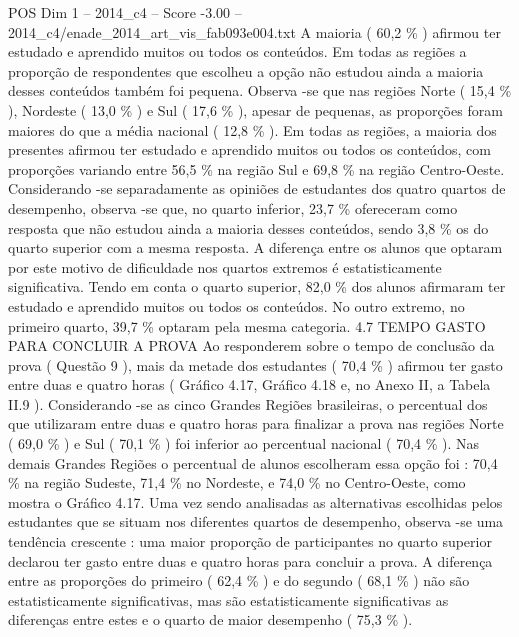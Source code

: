 \begin{textsample}{POS Dim 1 – 2014\_c4 – Score -3.00 – 2014\_c4/enade\_2014\_art\_vis\_fab093e004.txt}
A maioria ( 60,2 \% ) afirmou ter estudado e aprendido muitos ou todos os conteúdos.
Em todas as regiões a proporção de respondentes que escolheu a opção não estudou ainda a maioria desses conteúdos também foi pequena.
Observa -se que nas regiões Norte ( 15,4 \% ), Nordeste ( 13,0 \% ) e Sul ( 17,6 \% ), apesar de pequenas, as proporções foram maiores do que a média nacional ( 12,8 \% ).
Em todas as regiões, a maioria dos presentes afirmou ter estudado e aprendido muitos ou todos os conteúdos, com proporções variando entre 56,5 \% na região Sul e 69,8 \% na região Centro-Oeste.
Considerando -se separadamente as opiniões de estudantes dos quatro quartos de desempenho, observa -se que, no quarto inferior, 23,7 \% ofereceram como resposta que não estudou ainda a maioria desses conteúdos, sendo 3,8 \% os do quarto superior com a mesma resposta.
A diferença entre os alunos que optaram por este motivo de dificuldade nos quartos extremos é estatisticamente significativa.
Tendo em conta o quarto superior, 82,0 \% dos alunos afirmaram ter estudado e aprendido muitos ou todos os conteúdos.
No outro extremo, no primeiro quarto, 39,7 \% optaram pela mesma categoria. 4.7 TEMPO GASTO PARA CONCLUIR A PROVA Ao responderem sobre o tempo de conclusão da prova ( Questão 9 ), mais da metade dos estudantes ( 70,4 \% ) afirmou ter gasto entre duas e quatro horas ( Gráfico 4.17, Gráfico 4.18 e, no Anexo II, a Tabela II.9 ).
Considerando -se as cinco Grandes Regiões brasileiras, o percentual dos que utilizaram entre duas e quatro horas para finalizar a prova nas regiões Norte ( 69,0 \% ) e Sul ( 70,1 \% ) foi inferior ao percentual nacional ( 70,4 \% ).
Nas demais Grandes Regiões o percentual de alunos escolheram essa opção foi : 70,4 \% na região Sudeste, 71,4 \% no Nordeste, e 74,0 \% no Centro-Oeste, como mostra o Gráfico 4.17.
Uma vez sendo analisadas as alternativas escolhidas pelos estudantes que se situam nos diferentes quartos de desempenho, observa -se uma tendência crescente : uma maior proporção de participantes no quarto superior declarou ter gasto entre duas e quatro horas para concluir a prova.
A diferença entre as proporções do primeiro ( 62,4 \% ) e do segundo ( 68,1 \% ) não são estatisticamente significativas, mas são estatisticamente significativas as diferenças entre estes e o quarto de maior desempenho ( 75,3 \% ).

\end{textsample}
